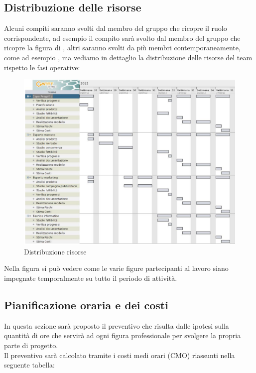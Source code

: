 \subsection{Distribuzione delle risorse}
Alcuni compiti saranno svolti dal membro del gruppo che ricopre il ruolo corrispondente, ad esempio il compito  sarà svolto dal membro del gruppo che ricopre la figura di , altri saranno svolti da più membri contemporaneamente, come ad esempio , ma vediamo in dettaglio la distribuzione delle risorse del team rispetto le fasi operative: \\

\begin{figure}[H]
\centering
\includegraphics[scale=0.65]{images/cap3/risorse.png}
\caption{Distribuzione risorse}
\end{figure}

\vspace*{0.5cm}

Nella figura  si può vedere come le varie figure partecipanti al lavoro siano impegnate temporalmente su tutto il periodo di attività.

\newpage
\subsection{Pianificazione oraria e dei costi}

In questa sezione sarà proposto il preventivo che risulta dalle ipotesi sulla quantità di ore che servirà ad ogni figura professionale per svolgere la propria parte di progetto.\\
Il preventivo sarà calcolato tramite i costi medi orari (CMO) riassunti nella seguente tabella:\\

